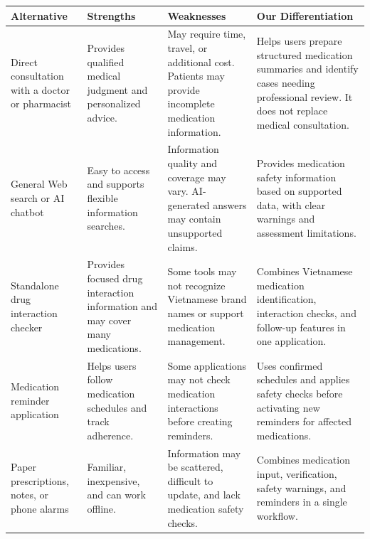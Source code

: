 \begin{longtable}{|L{0.23\textwidth}|L{0.23\textwidth}|L{0.24\textwidth}|L{0.20\textwidth}|}
\hline
\textbf{Alternative} &
\textbf{Strengths} &
\textbf{Weaknesses} &
\textbf{Our Differentiation}\\ \hline

Direct consultation with a doctor or pharmacist
& Provides qualified medical judgment and
personalized advice.
& May require time, travel, or additional cost.
Patients may provide incomplete medication information.
& Helps users prepare structured medication
summaries and identify cases needing professional review.
It does not replace medical consultation.
\\ \hline

General Web search or AI chatbot
& Easy to access and supports flexible
information searches.
& Information quality and coverage may vary.
AI-generated answers may contain unsupported claims.
& Provides medication safety information
based on supported data, with clear warnings
and assessment limitations.
\\ \hline

Standalone drug interaction checker
& Provides focused drug interaction information
and may cover many medications.
& Some tools may not recognize Vietnamese
brand names or support medication management.
& Combines Vietnamese medication identification,
interaction checks, and follow-up features
in one application.
\\ \hline

Medication reminder application
& Helps users follow medication schedules
and track adherence.
& Some applications may not check medication
interactions before creating reminders.
& Uses confirmed schedules and applies
safety checks before activating new reminders
for affected medications.
\\ \hline

Paper prescriptions, notes, or phone alarms
& Familiar, inexpensive, and can work offline.
& Information may be scattered, difficult to update,
and lack medication safety checks.
& Combines medication input, verification,
safety warnings, and reminders
in a single workflow.
\\ \hline

\end{longtable}
